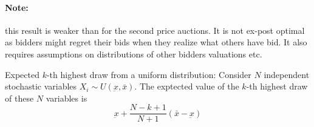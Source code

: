 \paragraph{Note:} this result is weaker than for the second price auctions. It is not ex-post optimal as bidders might regret their bids when they realize what others have bid. It also requires assumptions on distributions of other bidders valuations etc.


\begin{definition}{Expected $k$-th highest draw from a uniform distribution:} Consider $N$ independent stochastic variables $X_i\sim U(\underbar{x}, \bar{x})$. The exptected value of the $k$-th highest draw of these $N$ variables is
  \begin{equation}
    \underbar{x} + \frac{N-k+1}{N+1}(\bar{x} - \underbar{x})
  \end{equation}
\end{definition}
